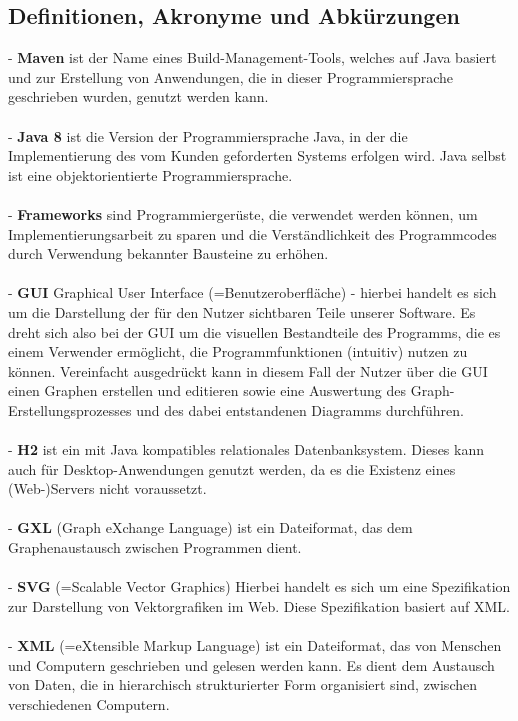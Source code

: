 \documentclass[enabledeprecatedfontcommands,fontsize=11pt,paper=a4,twoside]{scrartcl}
\newcounter{one}
\begin{document}
\subsection{Definitionen, Akronyme und Abkürzungen}
\label{sec:daa}
- \textbf{Maven} ist der Name eines Build-Management-Tools, welches auf Java basiert und zur Erstellung von Anwendungen, die in dieser Programmiersprache geschrieben wurden, genutzt werden kann. \\ \\
- \textbf{Java 8} ist die Version der Programmiersprache Java, in der die Implementierung des vom Kunden geforderten Systems erfolgen wird. Java selbst ist eine objektorientierte Programmiersprache. \\ \\
- \textbf{Frameworks} sind Programmiergerüste, die verwendet werden können, um Implementierungsarbeit zu sparen und die Verständlichkeit des Programmcodes durch Verwendung bekannter Bausteine zu erhöhen. \\ \\
- \textbf{GUI} Graphical User Interface (=Benutzeroberfläche) - hierbei handelt es sich um die Darstellung der für den Nutzer sichtbaren Teile unserer Software. Es dreht sich also bei der GUI um die visuellen Bestandteile des Programms, die es einem Verwender ermöglicht, die Programmfunktionen (intuitiv) nutzen zu können. Vereinfacht ausgedrückt kann in diesem Fall der Nutzer über die GUI einen Graphen erstellen und editieren sowie eine Auswertung des Graph-Erstellungsprozesses und des dabei entstandenen Diagramms durchführen. \\ \\
- \textbf{H2} ist ein mit Java kompatibles relationales Datenbanksystem. Dieses kann auch für Desktop-Anwendungen genutzt werden, da es die Existenz eines (Web-)Servers nicht voraussetzt.\\ \\
- \textbf{GXL} (Graph eXchange Language) ist ein Dateiformat, das dem Graphenaustausch zwischen Programmen dient. \\ \\
- \textbf{SVG} (=Scalable Vector Graphics) Hierbei handelt es sich um eine Spezifikation zur Darstellung von Vektorgrafiken im Web. Diese Spezifikation basiert auf XML.  \\ \\
- \textbf{XML} (=eXtensible Markup Language) ist ein Dateiformat, das von Menschen und Computern geschrieben und gelesen werden kann. Es dient dem Austausch von Daten, die in hierarchisch strukturierter Form organisiert sind, zwischen verschiedenen Computern. \\ \\
\end{document}
